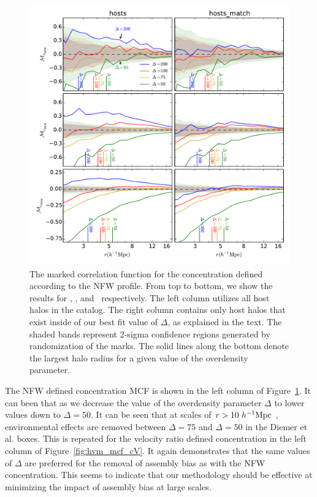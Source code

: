 \documentclass[usenatbib,usegraphicx,letterpaper]{mn2e}
\begin{document}
\begin{figure}
	\centering
	\includegraphics[width=\textwidth]{all_mcf_cnfw_z00_hostsvmatch.pdf}
	\caption{The marked correlation function for the concentration defined according to the NFW profile. From top to bottom, we show the results for \simA, \simB, and \simC \ respectively. The left column utilizes all host halos in the catalog. The right column contains only host halos that exist inside of our best fit value of $\Delta$, as explained in the text. The shaded bands represent 2-sigma confidence regions generated by randomization of the marks. The solid lines along the bottom denote the largest halo radius for a given value of the overdensity parameter. }
	\label{fig:hvm_mcf_cnfw}
\end{figure}

The NFW defined concentration MCF is shown in the left column of Figure~\ref{fig:hvm_mcf_cnfw}. It can been that as we decrease the value of the overdensity parameter $\Delta$ to lower values down to $\Delta = 50$. It can be seen that at scales of $r > 10 \ h^{-1}\mathrm{Mpc}~$, environmental effects are removed between $\Delta = 75$ and $\Delta = 50$ in the Diemer et al. boxes. This is repeated for the velocity ratio defined concentration in the left column of Figure~\ref{fig:hvm_mcf_cV}. It again demonstrates that the same values of $\Delta$ are preferred for the removal of assembly bias as with the NFW concentration. This seems to indicate that our methodology should be effective at minimizing the impact of assembly bias at large scales.
\end{document}
